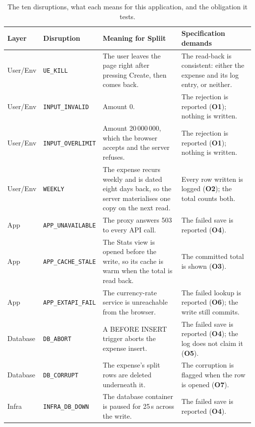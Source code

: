 \documentclass[11pt,a4paper]{article}
\newcommand{\gate}[1]{\texttt{\small #1}}
\newcommand{\obl}[1]{\textbf{O#1}}
\begin{document}
\begin{table}[h]
\centering\footnotesize
\caption{The ten disruptions, what each means for this application, and the
obligation it tests.}
\label{tab:disruptions}
\begin{tabular}{@{}llp{5.0cm}p{4.0cm}@{}}
\toprule
Layer & Disruption & Meaning for Spliit & Specification demands \\
\midrule
User/Env & \gate{UE\_KILL} & The user leaves the page right after pressing
Create, then comes back. & The read-back is consistent: either the expense and
its log entry, or neither. \\
\addlinespace
User/Env & \gate{INPUT\_INVALID} & Amount 0. & The rejection is reported
(\obl{1}); nothing is written. \\
\addlinespace
User/Env & \gate{INPUT\_OVERLIMIT} & Amount 20\,000\,000, which the browser
accepts and the server refuses. & The rejection is reported (\obl{1}); nothing
is written. \\
\addlinespace
User/Env & \gate{WEEKLY} & The expense recurs weekly and is dated eight days
back, so the server materialises one copy on the next read. & Every row written
is logged (\obl{2}); the total counts both. \\
\addlinespace
App & \gate{APP\_UNAVAILABLE} & The proxy answers 503 to every API call. & The
failed save is reported (\obl{4}). \\
\addlinespace
App & \gate{APP\_CACHE\_STALE} & The Stats view is opened before the write, so
its cache is warm when the total is read back. & The committed total is shown
(\obl{3}). \\
\addlinespace
App & \gate{APP\_EXTAPI\_FAIL} & The currency-rate service is unreachable from the
browser. & The failed lookup is reported (\obl{6}); the write still commits. \\
\addlinespace
Database & \gate{DB\_ABORT} & A BEFORE INSERT trigger aborts the expense insert.
& The failed save is reported (\obl{4}); the log does not claim it (\obl{5}). \\
\addlinespace
Database & \gate{DB\_CORRUPT} & The expense's split rows are deleted underneath
it. & The corruption is flagged when the row is opened (\obl{7}). \\
\addlinespace
Infra & \gate{INFRA\_DB\_DOWN} & The database container is paused for 25\,s
across the write. & The failed save is reported (\obl{4}). \\
\bottomrule
\end{tabular}
\end{table}
\end{document}
